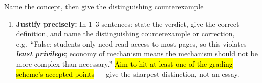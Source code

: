 \documentclass[12pt, a4paper]{article}
\newcommand{\term}[1]{\textbf{\textit{#1}}}        %
\newcommand{\imp}[1]{\hl{#1}}                       %
\begin{document}
\begin{schemebox}{Name the concept, then give the distinguishing counterexample}
\begin{enumerate}[label=\textbf{Step \arabic*:}, leftmargin=*]
    For club-marked multiple choice, judge each option A--D \term{independently} --- several (or none) may be true, and never select ``None of these answers are correct'' together with another option.
    \item \textbf{Justify precisely:} In 1--3 sentences: state the verdict, give the correct definition, and name the distinguishing counterexample or correction, e.g.\ ``False: students only need read access to most pages, so this violates \term{least privilege};
    economy of mechanism means the mechanism should not be more complex than necessary.'' \imp{Aim to hit at least one of the grading scheme's accepted points} --- give the sharpest distinction, not an essay.
\end{enumerate}
\end{schemebox}
\end{document}
